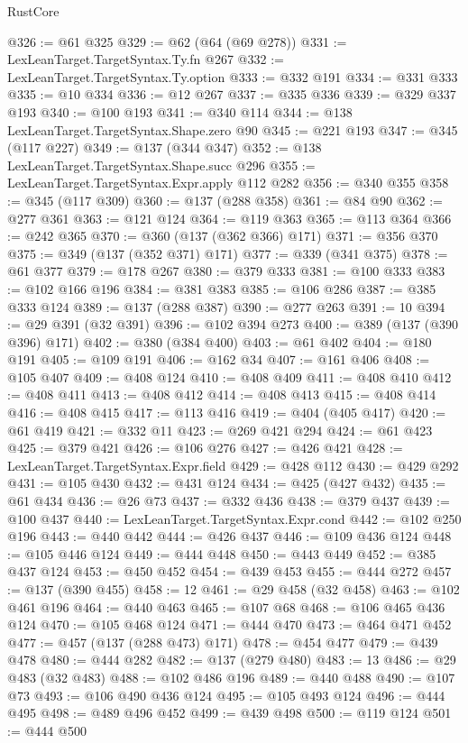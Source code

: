 \begin{lexlean}{RustCore}
\begin{coremodule}
@326 := @61 @325
@329 := @62 (@64 (@69 @278))
@331 := LexLeanTarget.TargetSyntax.Ty.fn @267
@332 := LexLeanTarget.TargetSyntax.Ty.option
@333 := @332 @191
@334 := @331 @333
@335 := @10 @334
@336 := @12 @267
@337 := @335 @336
@339 := @329 @337 @193
@340 := @100 @193
@341 := @340 @114
@344 := @138 LexLeanTarget.TargetSyntax.Shape.zero @90
@345 := @221 @193
@347 := @345 (@117 @227)
@349 := @137 (@344 @347)
@352 := @138 LexLeanTarget.TargetSyntax.Shape.succ @296
@355 := LexLeanTarget.TargetSyntax.Expr.apply @112 @282
@356 := @340 @355
@358 := @345 (@117 @309)
@360 := @137 (@288 @358)
@361 := @84 @90
@362 := @277 @361
@363 := @121 @124
@364 := @119 @363
@365 := @113 @364
@366 := @242 @365
@370 := @360 (@137 (@362 @366) @171)
@371 := @356 @370
@375 := @349 (@137 (@352 @371) @171)
@377 := @339 (@341 @375)
@378 := @61 @377
@379 := @178 @267
@380 := @379 @333
@381 := @100 @333
@383 := @102 @166 @196
@384 := @381 @383
@385 := @106 @286
@387 := @385 @333 @124
@389 := @137 (@288 @387)
@390 := @277 @263
@391 := 10
@394 := @29 @391 (@32 @391)
@396 := @102 @394 @273
@400 := @389 (@137 (@390 @396) @171)
@402 := @380 (@384 @400)
@403 := @61 @402
@404 := @180 @191
@405 := @109 @191
@406 := @162 @34
@407 := @161 @406
@408 := @105 @407
@409 := @408 @124
@410 := @408 @409
@411 := @408 @410
@412 := @408 @411
@413 := @408 @412
@414 := @408 @413
@415 := @408 @414
@416 := @408 @415
@417 := @113 @416
@419 := @404 (@405 @417)
@420 := @61 @419
@421 := @332 @11
@423 := @269 @421 @294
@424 := @61 @423
@425 := @379 @421
@426 := @106 @276
@427 := @426 @421
@428 := LexLeanTarget.TargetSyntax.Expr.field
@429 := @428 @112
@430 := @429 @292
@431 := @105 @430
@432 := @431 @124
@434 := @425 (@427 @432)
@435 := @61 @434
@436 := @26 @73
@437 := @332 @436
@438 := @379 @437
@439 := @100 @437
@440 := LexLeanTarget.TargetSyntax.Expr.cond
@442 := @102 @250 @196
@443 := @440 @442
@444 := @426 @437
@446 := @109 @436 @124
@448 := @105 @446 @124
@449 := @444 @448
@450 := @443 @449
@452 := @385 @437 @124
@453 := @450 @452
@454 := @439 @453
@455 := @444 @272
@457 := @137 (@390 @455)
@458 := 12
@461 := @29 @458 (@32 @458)
@463 := @102 @461 @196
@464 := @440 @463
@465 := @107 @68
@468 := @106 @465 @436 @124
@470 := @105 @468 @124
@471 := @444 @470
@473 := @464 @471 @452
@477 := @457 (@137 (@288 @473) @171)
@478 := @454 @477
@479 := @439 @478
@480 := @444 @282
@482 := @137 (@279 @480)
@483 := 13
@486 := @29 @483 (@32 @483)
@488 := @102 @486 @196
@489 := @440 @488
@490 := @107 @73
@493 := @106 @490 @436 @124
@495 := @105 @493 @124
@496 := @444 @495
@498 := @489 @496 @452
@499 := @439 @498
@500 := @119 @124
@501 := @444 @500

\end{coremodule}
\end{lexlean}
